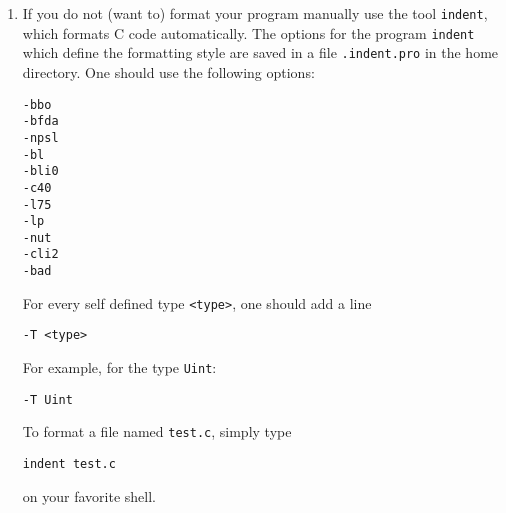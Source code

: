 \documentclass[12pt]{article}
\begin{document}
\begin{enumerate}
\item 
If you do not (want to) format your program manually use the tool \texttt{indent}, which formats C code automatically.
The options for the program \texttt{indent} which define the formatting style are saved in a file \texttt{.indent.pro} in the home directory. One should use the following options:
\begin{footnotesize}
\begin{verbatim}
-bbo
-bfda
-npsl
-bl
-bli0
-c40
-l75
-lp
-nut
-cli2
-bad
\end{verbatim}
\end{footnotesize}
For every self defined type \texttt{<type>}, one should add a line
\begin{verbatim}
-T <type>
\end{verbatim}
For example, for the type \texttt{Uint}:
\begin{verbatim}
-T Uint
\end{verbatim}
To format a file named \texttt{test.c}, simply type
\begin{verbatim}
indent test.c
\end{verbatim}
on your favorite shell.
\end{enumerate}
\end{document}
